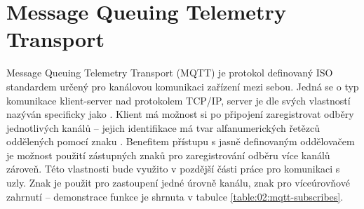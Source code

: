 \section{Message Queuing Telemetry Transport}
Message Queuing Telemetry Transport (MQTT) je protokol definovaný ISO standardem určený pro kanálovou komunikaci zařízení
mezi sebou. Jedná se o typ komunikace klient-server nad protokolem TCP/IP, server je dle svých vlastností nazýván specificky
jako . Klient má možnost si po připojení zaregistrovat odběry jednotlivých kanálů -- jejich identifikace má tvar
alfanumerických řetězců oddělených pomocí znaku \uv{/}. Benefitem přístupu s jasně definovaným oddělovačem je možnost použití zástupných znaků pro
zaregistrování odběru více kanálů zároveň. Této vlastnosti bude využito v pozdější části práce pro komunikaci s uzly. Znak \uv{+}
je použit pro zastoupení jedné úrovně kanálu, znak \uv{\#} pro víceúrovňové zahrnutí -- demonstrace funkce je shrnuta v
tabulce \ref{table:02:mqtt-subscribes}.

